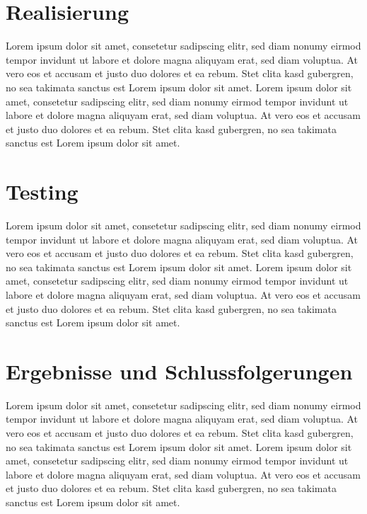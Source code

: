 \section{Realisierung}
Lorem ipsum dolor sit amet, consetetur sadipscing elitr, sed diam nonumy eirmod tempor invidunt ut labore et dolore magna aliquyam erat, sed diam voluptua. At vero eos et accusam et justo duo dolores et ea rebum. Stet clita kasd gubergren, no sea takimata sanctus est Lorem ipsum dolor sit amet. Lorem ipsum dolor sit amet, consetetur sadipscing elitr, sed diam nonumy eirmod tempor invidunt ut labore et dolore magna aliquyam erat, sed diam voluptua. At vero eos et accusam et justo duo dolores et ea rebum. Stet clita kasd gubergren, no sea takimata sanctus est Lorem ipsum dolor sit amet.

\section{Testing}
Lorem ipsum dolor sit amet, consetetur sadipscing elitr, sed diam nonumy eirmod tempor invidunt ut labore et dolore magna aliquyam erat, sed diam voluptua. At vero eos et accusam et justo duo dolores et ea rebum. Stet clita kasd gubergren, no sea takimata sanctus est Lorem ipsum dolor sit amet. Lorem ipsum dolor sit amet, consetetur sadipscing elitr, sed diam nonumy eirmod tempor invidunt ut labore et dolore magna aliquyam erat, sed diam voluptua. At vero eos et accusam et justo duo dolores et ea rebum. Stet clita kasd gubergren, no sea takimata sanctus est Lorem ipsum dolor sit amet.

\section{Ergebnisse und Schlussfolgerungen}
Lorem ipsum dolor sit amet, consetetur sadipscing elitr, sed diam nonumy eirmod tempor invidunt ut labore et dolore magna aliquyam erat, sed diam voluptua. At vero eos et accusam et justo duo dolores et ea rebum. Stet clita kasd gubergren, no sea takimata sanctus est Lorem ipsum dolor sit amet. Lorem ipsum dolor sit amet, consetetur sadipscing elitr, sed diam nonumy eirmod tempor invidunt ut labore et dolore magna aliquyam erat, sed diam voluptua. At vero eos et accusam et justo duo dolores et ea rebum. Stet clita kasd gubergren, no sea takimata sanctus est Lorem ipsum dolor sit amet.